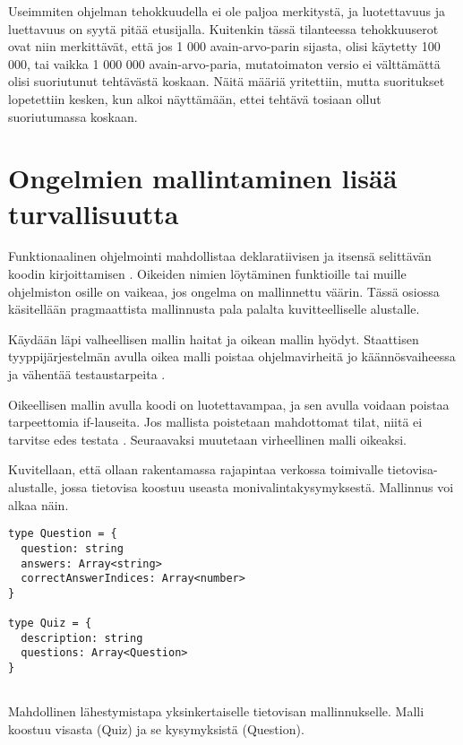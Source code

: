 Useimmiten ohjelman tehokkuudella ei ole paljoa merkitystä, ja luotettavuus ja luettavuus on syytä pitää etusijalla. Kuitenkin tässä tilanteessa tehokkuuserot ovat niin merkittävät, että jos 1 000 avain-arvo-parin sijasta, olisi käytetty 100 000, tai vaikka 1 000 000 avain-arvo-paria, mutatoimaton versio ei välttämättä olisi suoriutunut tehtävästä koskaan. Näitä määriä yritettiin, mutta suoritukset lopetettiin kesken, kun alkoi näyttämään, ettei tehtävä tosiaan ollut suoriutumassa koskaan.

\section{Ongelmien mallintaminen lisää turvallisuutta}

Funktionaalinen ohjelmointi mahdollistaa deklaratiivisen ja itsensä selittävän koodin kirjoittamisen \cite{ms:fp_vs_imperative}. Oikeiden nimien löytäminen funktioille tai muille ohjelmiston osille on vaikeaa, jos ongelma on mallinnettu väärin. Tässä osiossa käsitellään pragmaattista mallinnusta pala palalta kuvitteelliselle alustalle.

Käydään läpi valheellisen mallin haitat ja oikean mallin hyödyt. Staattisen tyyppijärjestelmän avulla oikea malli poistaa ohjelmavirheitä jo käännösvaiheessa ja vähentää testaustarpeita \cite{impossiblebetter}.

Oikeellisen mallin avulla koodi on luotettavampaa, ja sen avulla voidaan poistaa tarpeettomia if-lauseita. Jos mallista poistetaan mahdottomat tilat, niitä ei tarvitse edes testata \cite{impossiblebetter}. Seuraavaksi muutetaan virheellinen malli oikeaksi.

Kuvitellaan, että ollaan rakentamassa rajapintaa verkossa toimivalle tietovisa-alustalle, jossa tietovisa koostuu useasta monivalintakysymyksestä. Mallinnus voi alkaa näin.

\begin{code}
    \begin{verbatim}
type Question = {
  question: string
  answers: Array<string>
  correctAnswerIndices: Array<number>
}

type Quiz = {
  description: string
  questions: Array<Question>
}
         
\end{verbatim}
    \caption{Mahdollinen lähestymistapa yksinkertaiselle tietovisan mallinnukselle. Malli koostuu visasta (Quiz) ja se kysymyksistä (Question).}
    \label{code:ts_first_quiz}
\end{code}

